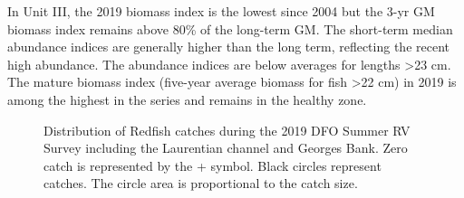 \documentclass[11pt]{book}
\begin{document}
In Unit III, the 2019 biomass index is the lowest since 2004 but the 3-yr GM biomass index remains above 80\% of the long-term GM. The short-term median abundance indices are generally higher than the long term, reflecting the recent high abundance. The abundance indices are below averages for lengths \textgreater23 cm. The mature biomass index (five-year average biomass for fish \textgreater22 cm) in 2019 is among the highest in the series and remains in the healthy zone.


\begin{figure}[htb]

{\centering {} 

}

\caption{Distribution of Redfish catches during the 2019 DFO Summer RV Survey including the Laurentian channel and Georges Bank. Zero catch is represented by the + symbol. Black circles represent catches. The circle area is proportional to the catch size.}\label{fig:36-map-redfish}
\end{figure}
\end{document}
